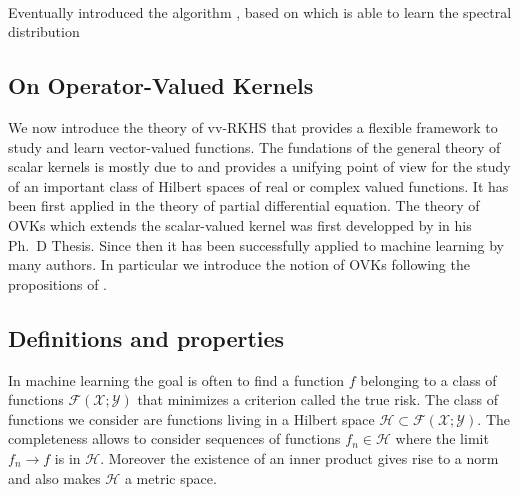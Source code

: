 \documentclass[twoside,11pt]{article}
\begin{document}
\paragraph{}
Eventually \citet{Yang2015} introduced the algorithm , based
on  which is able to learn the spectral distribution


\subsection{On Operator-Valued Kernels}
\label{sec:background_on_operator-valued_kernels} We now introduce the theory
of \acf{vv-RKHS} that provides a flexible framework to study and learn
vector-valued functions. The fundations of the general theory of scalar kernels
is mostly due to \citet{Aronszajn1950}  and provides a unifying point of view
for the study of an important class of Hilbert spaces of real or complex valued
functions. It has been first applied in the theory of partial differential
equation. The theory of \acfp{OVK} which extends the scalar-valued kernel was
first developped by \citet{Pedrick57} in his Ph.~D Thesis. Since then it has
been successfully applied to machine learning by many authors. In particular we
introduce the notion of \aclp{OVK} following the propositions of
\citet{Micchelli2005,carmeli2006vector,Carmeli2010}.
\subsection{Definitions and properties}
\label{subsec:def_properties} In machine learning the goal is often to find a
function $f$ belonging to a class of functions
$\mathcal{F}(\mathcal{X};\mathcal{Y})$ that minimizes a criterion called the
true risk. The class of functions we consider are functions living in a Hilbert
space $\mathcal{H}\subset\mathcal{F}(\mathcal{X};\mathcal{Y})$. The
completeness allows to consider sequences of functions $f_n \in\mathcal{H}$
where the limit $f_n\to f$ is in $\mathcal{H}$. Moreover the existence of an
inner product gives rise to a norm and also makes $\mathcal{H}$ a metric space.
\end{document}
